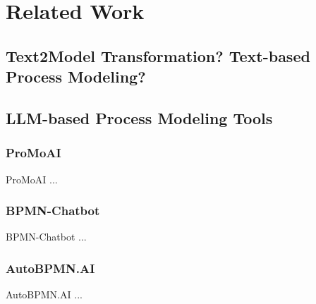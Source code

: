\chapter{Related Work}
\label{sec:rel}
\section{Text2Model Transformation? Text-based Process Modeling?}
\section{LLM-based Process Modeling Tools}
\subsection{ProMoAI}
ProMoAI \cite{ProMoAI} ...
\subsection{BPMN-Chatbot}
BPMN-Chatbot ...
\subsection{AutoBPMN.AI}
AutoBPMN.AI \cite{AutoBPMN.AI} ...


